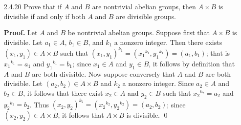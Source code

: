 \begin{enumerate}
      \begin{enumerate}
         \item Let $k$ be a nonzero integer and $a/b \in \Q$, where $a$ and $b$
               are integers, with $b \neq 0$. Since $b$ and $k$ are both
               nonzero, it follows that $bk$ is also nonzero, so that
               $a/bk \in \Q$. Since $k(a/bk) = a/b$, it follows immediately that
               the additive group $\Q$ is divisible.
         \item Let $G$ be a nontrivial finite abelian group. Since $G$ is
               nontrivial, we can select some nonidentity $g \in G$. Now let
               $k = |G|$ and $x \in G$. By Lagrange's Theorem, we have
               $k = |x| \cdot y$ for some positive integer $y$. Thus
               $x^k = x^{|x|y} = (x^{|x|})^y = 1^y = 1 \neq g$, so that $g$
               does not have a $k^{\text{th}}$ root in $G$; that is, $G$ is not
               divisible. 
      \end{enumerate} \qed
   \item[2.4.20]  Prove that if $A$ and $B$ are nontrivial abelian groups, then
                  $A \times B$ is divisible if and only if both $A$ and $B$ are
                  divisible groups.
                  
      \textbf{Proof.} Let $A$ and $B$ be nontrivial abelian groups. Suppose
      first that $A \times B$ is divisible. Let $a_1 \in A$, $b_1 \in B$, and
      $k_1$ a nonzero integer. Then there exists $(x_1, y_1) \in A \times B$
      such that $(x_1, y_1)^{k_1} = ({x_1}^{k_1}, {y_1}^{k_1}) = (a_1, b_1)$;
      that is ${x_1}^{k_1} = a_1$ and ${y_1}^{k_1} = b_1$; since $x_1 \in A$ and
      $y_1 \in B$, it follows by definition that $A$ and $B$ are both divisible.
      Now suppose conversely that $A$ and $B$ are both divisible. Let
      $(a_2, b_2) \in A \times B$ and $k_2$ a nonzero integer. Since $a_2 \in A$
      and $b_2 \in B$, it follows that there exist $x_2 \in A$ and $y_2 \in B$
      such that ${x_2}^{k_2} = a_2$ and ${y_2}^{k_2} = b_2$. Thus
      $(x_2, y_2)^{k_2} = ({x_2}^{k_2}, {y_2}^{k_2}) = (a_2, b_2)$; since
      $(x_2, y_2) \in A \times B$, it follows that $A \times B$ is divisible.
      \qed
\end{enumerate}

































